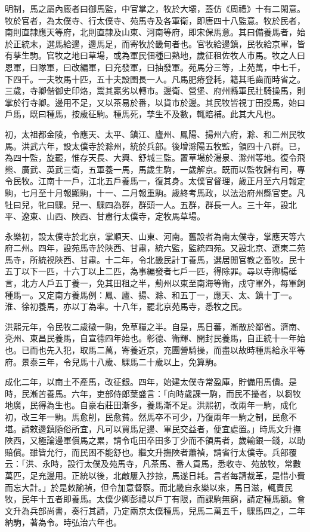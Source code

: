 明制，馬之屬內廄者曰御馬監，中官掌之，牧於大壩，蓋仿《周禮》十有二閑意。牧於官者，為太僕寺、行太僕寺、苑馬寺及各軍衛，即唐四十八監意。牧於民者，南則直隸應天等府，北則直隸及山東、河南等府，即宋保馬意。其曰備養馬者，始於正統末，選馬給邊，邊馬足，而寄牧於畿甸者也。官牧給邊鎮，民牧給京軍，皆有孳生駒。官牧之地曰草場，或為軍民佃種曰熟地，歲征租佐牧人市馬。牧之人曰恩軍，曰隊軍，曰改編軍，曰充發軍，曰抽發軍。苑馬分三等，上苑萬，中七千，下四千。一夫牧馬十匹，五十夫設圉長一人。凡馬肥瘠登耗，籍其毛齒而時省之。三歲，寺卿偕御史印烙，鬻其羸劣以轉市。邊衛、營堡、府州縣軍民壯騎操馬，則掌於行寺卿。邊用不足，又以茶易於番，以貨市於邊。其民牧皆視丁田授馬，始曰戶馬，既曰種馬，按歲征駒。種馬死，孳生不及數，輒賠補。此其大凡也。

初，太祖都金陵，令應天、太平、鎮江、廬州、鳳陽、揚州六府，滁、和二州民牧馬。洪武六年，設太僕寺於滁州，統於兵部。後增滁陽五牧監，領四十八群。已，為四十監，旋罷，惟存天長、大興、舒城三監。置草場於湯泉、滁州等地。復令飛熊、廣武、英武三衛，五軍養一馬，馬歲生駒，一歲解京。既而以監牧歸有司，專令民牧。江南十一戶，江北五戶養馬一，復其身。太僕官督理，歲正月至六月報定駒，七月至十月報顯駒，十一、二月報重駒。歲終考馬政，以法治府州縣官吏。凡牡曰兒，牝曰騍。兒一、騍四為群，群頭一人。五群，群長一人。三十年，設北平、遼東、山西、陜西、甘肅行太僕寺，定牧馬草場。

永樂初，設太僕寺於北京，掌順天、山東、河南。舊設者為南太僕寺，掌應天等六府二州。四年，設苑馬寺於陜西、甘肅，統六監，監統四苑。又設北京、遼東二苑馬寺，所統視陜西、甘肅。十二年，令北畿民計丁養馬，選居閒官教之畜牧。民十五丁以下一匹，十六丁以上二匹，為事編發者七戶一匹，得除罪。尋以寺卿楊砥言，北方人戶五丁養一，免其田租之半，薊州以東至南海等衛，戍守軍外，每軍飼種馬一。又定南方養馬例：鳳、廬、揚、滁、和五丁一，應天、太、鎮十丁一。淮、徐初養馬，亦以丁為率。十八年，罷北京苑馬寺，悉牧之民。

洪熙元年，令民牧二歲徵一駒，免草糧之半。自是，馬日蕃，漸散於鄰省。濟南、兗州、東昌民養馬，自宣德四年始也。彰德、衛輝、開封民養馬，自正統十一年始也。已而也先入犯，取馬二萬，寄養近京，充團營騎操，而盡以故時種馬給永平等府。景泰三年，令兒馬十八歲、騍馬二十歲以上，免算駒。

成化二年，以南土不產馬，改征銀。四年，始建太僕寺常盈庫，貯備用馬價。是時，民漸苦養馬。六年，吏部侍郎葉盛言：「向時歲課一駒，而民不擾者，以芻牧地廣，民得為生也。自豪右莊田漸多，養馬漸不足。洪熙初，改兩年一駒，成化初，改三年一駒。馬愈削，民愈貧。然馬卒不可少，乃復兩年一駒之制，民愈不堪。請敕邊鎮隨俗所宜，凡可以買馬足邊、軍民交益者，便宜處置。」時馬文升撫陜西，又極論邊軍償馬之累，請令屯田卒田多丁少而不領馬者，歲輸銀一錢，以助賠償。雖皆允行，而民困不能舒也。繼文升撫陜者蕭禎，請省行太僕寺。兵部覆云：「洪、永時，設行太僕及苑馬寺，凡茶馬、番人貢馬，悉收寺、苑放牧，常數萬匹，足充邊用。正統以後，北敵屢入抄掠，馬遂日耗。言者每請裁革，是惜小費而忘大計。」於是敕諭禎，但令加意督察。而北畿自永樂以來，馬日滋，輒責民牧，民年十五者即養馬。太僕少卿彭禮以戶丁有限，而課駒無窮，請定種馬額。會文升為兵部尚書，奏行其請，乃定兩京太僕種馬，兒馬二萬五千，騍馬四之，二年納駒，著為令。時弘治六年也。

